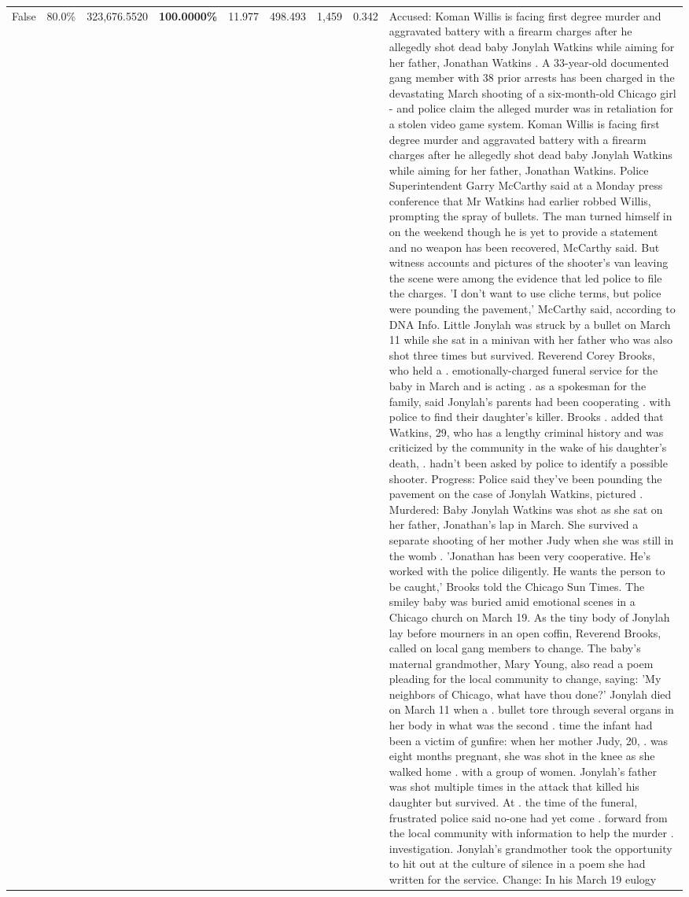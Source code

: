 \begin{table}[H]
\begin{tabular}{lllrlllll}
False & 80.0\% & 323,676.5520 & \bfseries \color{red} 100.0000\% & 11.977 & 498.493 & 1,459 & 0.342 & Accused: Koman Willis is facing first degree murder and aggravated battery with a firearm charges after he allegedly shot dead baby Jonylah Watkins while aiming for her father, Jonathan Watkins . A 33-year-old documented gang member with 38 prior arrests has been charged in the devastating March shooting of a six-month-old Chicago girl - and police claim the alleged murder was in retaliation for a stolen video game system. Koman Willis is facing first degree murder and aggravated battery with a firearm charges after he allegedly shot dead baby Jonylah Watkins while aiming for her father, Jonathan Watkins. Police Superintendent Garry McCarthy said at a Monday press conference that Mr Watkins had earlier robbed Willis, prompting the spray of bullets. The man turned himself in on the weekend though he is yet to provide a statement and no weapon has been recovered, McCarthy said. But witness accounts and pictures of the shooter's van leaving the scene were among the evidence that led police to file the charges. 'I don't want to use cliche terms, but police were pounding the pavement,' McCarthy said, according to DNA Info. Little Jonylah was struck by a bullet on March 11 while she sat in a minivan with her father who was also shot three times but survived. Reverend Corey Brooks, who held a . emotionally-charged funeral service for the baby in March and is acting . as a spokesman for the family, said Jonylah's parents had been cooperating . with police to find their daughter's killer. Brooks . added that Watkins, 29, who has a lengthy criminal history and was criticized by the community in the wake of his daughter's death, . hadn't been asked by police to identify a possible shooter. Progress: Police said they've been pounding the pavement on the case of Jonylah Watkins, pictured . Murdered: Baby Jonylah Watkins was shot as she sat on her father, Jonathan's lap in March. She survived a separate shooting of her mother Judy when she was still in the womb . 'Jonathan has been very cooperative. He's worked with the police diligently. He wants the person to be caught,' Brooks told the Chicago Sun Times. The smiley baby was buried amid emotional scenes in a Chicago church on March 19. As the tiny body of Jonylah lay before mourners in an open coffin, Reverend Brooks, called on local gang members to change. The baby's maternal grandmother, Mary Young, also read a poem pleading for the local community to change, saying: 'My neighbors of Chicago, what have thou done?' Jonylah died on March 11 when a . bullet tore through several organs in her body in what was the second . time the infant had been a victim of gunfire: when her mother Judy, 20, . was eight months pregnant, she was shot in the knee as she walked home . with a group of women. Jonylah's father was shot multiple times in the attack that killed his daughter but survived. At . the time of the funeral, frustrated police said no-one had yet come . forward from the local community with information to help the murder . investigation. Jonylah's grandmother took the opportunity to hit out at the culture of silence in a poem she had written for the service. Change: In his March 19 eulogy 
\end{tabular}
\end{table}

